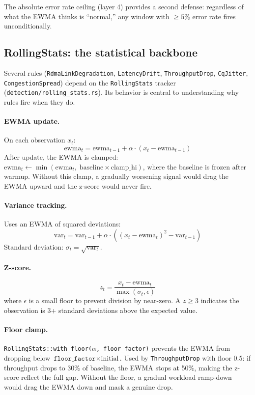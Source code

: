 \documentclass[11pt]{article}
\begin{document}
The absolute error rate ceiling (layer 4) provides a second defense:
regardless of what the EWMA thinks is ``normal,'' any window with
$\geq 5$\% error rate fires unconditionally.

\subsection{RollingStats: the statistical backbone}
\label{sec:rolling-stats}

Several rules (\texttt{RdmaLinkDegradation}, \texttt{LatencyDrift},
\texttt{ThroughputDrop}, \texttt{CqJitter}, \texttt{CongestionSpread})
depend on the \texttt{RollingStats} tracker
(\texttt{detection/rolling\_stats.rs}). Its behavior is central to
understanding why rules fire when they do.

\paragraph{EWMA update.}
On each observation $x_t$:
\[
  \text{ewma}_t = \text{ewma}_{t-1} + \alpha \cdot (x_t - \text{ewma}_{t-1})
\]
After update, the EWMA is clamped:
$\text{ewma}_t \leftarrow \min(\text{ewma}_t,\; \text{baseline} \times
\text{clamp\_hi})$, where the baseline is frozen after warmup. Without this
clamp, a gradually worsening signal would drag the EWMA upward and the
z-score would never fire.

\paragraph{Variance tracking.}
Uses an EWMA of squared deviations:
\[
  \text{var}_t = \text{var}_{t-1} + \alpha \cdot
  \left((x_t - \text{ewma}_t)^2 - \text{var}_{t-1}\right)
\]
Standard deviation: $\sigma_t = \sqrt{\text{var}_t}$.

\paragraph{Z-score.}
\[
  z_t = \frac{x_t - \text{ewma}_t}{\max(\sigma_t, \epsilon)}
\]
where $\epsilon$ is a small floor to prevent division by near-zero. A
$z \geq 3$ indicates the observation is 3+ standard deviations above the
expected value.

\paragraph{Floor clamp.}
\texttt{RollingStats::with\_floor($\alpha$, floor\_factor)} prevents the
EWMA from dropping below $\texttt{floor\_factor} \times \text{initial}$.
Used by \texttt{ThroughputDrop} with floor 0.5: if throughput drops to
30\% of baseline, the EWMA stops at 50\%, making the z-score reflect the
full gap. Without the floor, a gradual workload ramp-down would drag the
EWMA down and mask a genuine drop.
\end{document}
